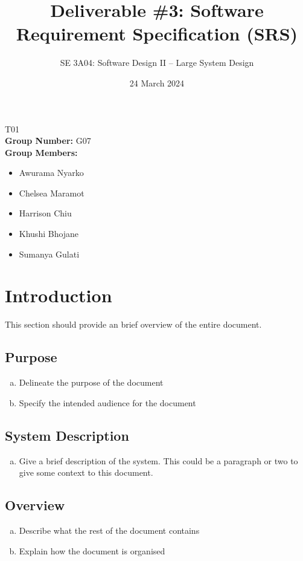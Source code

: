 \documentclass[]{article}
\title{Deliverable \#3: Software Requirement Specification (SRS)}
\author{SE 3A04: Software Design II -- Large System Design}
\date{24 March 2024}
\begin{document}
\maketitle
{} T01\\
{\bf Group Number:} G07 \\
{\bf Group Members:}
\begin{itemize}
	\item Awurama Nyarko
	\item Chelsea Maramot
	\item Harrison Chiu
	\item Khushi Bhojane
	\item Sumanya Gulati
\end{itemize}

\section{Introduction}
\label{sec:introduction}

This section should provide an brief overview of the entire document.

\subsection{Purpose}
\label{sub:purpose}
\begin{enumerate}[a)]
	\item Delineate the purpose of the document
	\item Specify the intended audience for the document
\end{enumerate}

\subsection{System Description}
\label{sub:system_description}
\begin{enumerate}[a)]
	\item Give a brief description of the system. This could be a paragraph or two to give some context to this document.
\end{enumerate}

\subsection{Overview}
\label{sub:overview}
\begin{enumerate}[a)]
	\item Describe what the rest of the document contains 
	\item Explain how the document is organised
\end{enumerate}
\end{document}
